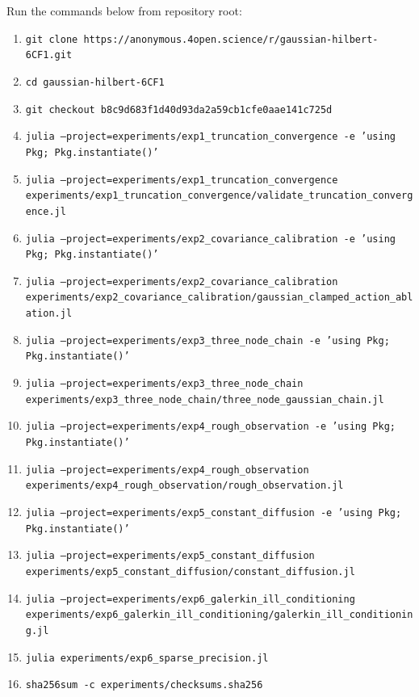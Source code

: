 Run the commands below from repository root:
\begin{enumerate}
    \item \texttt{git clone https://anonymous.4open.science/r/gaussian-hilbert-6CF1.git}
    \item \texttt{cd gaussian-hilbert-6CF1}
    \item \texttt{git checkout b8c9d683f1d40d93da2a59cb1cfe0aae141c725d}
    \item \texttt{julia --project=experiments/exp1\_truncation\_convergence -e 'using Pkg; Pkg.instantiate()'}
    \item \texttt{julia --project=experiments/exp1\_truncation\_convergence experiments/exp1\_truncation\_convergence/validate\_truncation\_convergence.jl}
    \item \texttt{julia --project=experiments/exp2\_covariance\_calibration -e 'using Pkg; Pkg.instantiate()'}
    \item \texttt{julia --project=experiments/exp2\_covariance\_calibration experiments/exp2\_covariance\_calibration/gaussian\_clamped\_action\_ablation.jl}
    \item \texttt{julia --project=experiments/exp3\_three\_node\_chain -e 'using Pkg; Pkg.instantiate()'}
    \item \texttt{julia --project=experiments/exp3\_three\_node\_chain experiments/exp3\_three\_node\_chain/three\_node\_gaussian\_chain.jl}
    \item \texttt{julia --project=experiments/exp4\_rough\_observation -e 'using Pkg; Pkg.instantiate()'}
    \item \texttt{julia --project=experiments/exp4\_rough\_observation experiments/exp4\_rough\_observation/rough\_observation.jl}
    \item \texttt{julia --project=experiments/exp5\_constant\_diffusion -e 'using Pkg; Pkg.instantiate()'}
    \item \texttt{julia --project=experiments/exp5\_constant\_diffusion experiments/exp5\_constant\_diffusion/constant\_diffusion.jl}
    \item \texttt{julia --project=experiments/exp6\_galerkin\_ill\_conditioning experiments/exp6\_galerkin\_ill\_conditioning/galerkin\_ill\_conditioning.jl}
    \item \texttt{julia experiments/exp6\_sparse\_precision.jl}
    \item \texttt{sha256sum -c experiments/checksums.sha256}
\end{enumerate}

